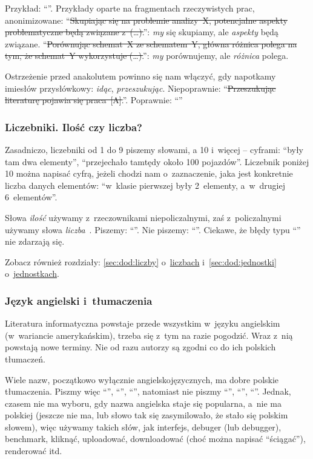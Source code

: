 Przykład: ``''. Przykłady oparte na fragmentach rzeczywistych prac, anonimizowane: ``{\color{red}\sout{Skupiając się na problemie analizy~X, potencjalne aspekty problematyczne będą związane z~(\dots).}}'': {\em my} się skupiamy, ale {\em aspekty} będą związane. ``{\color{red}\sout{Porównując schemat~X ze schematem~Y, główna różnica polega na tym, że schemat~Y wykorzystuje (\dots).}}'': {\em my} porównujemy, ale {\em różnica} polega.

Ostrzeżenie przed anakolutem powinno się nam włączyć, gdy napotkamy imiesłów przysłówkowy: {\em idąc}, {\em przeszukując}. Niepoprawnie: ``{\color{red}\sout{Przeszukując literaturę po\-ja\-wia się praca~[A].}}''. Poprawnie: ``''


\subsubsection{Liczebniki. Ilość czy liczba?}
\label{sec:dod:liczebniki}

Zasadniczo, liczebniki od 1 do 9 piszemy słowami, a 10 i~więcej -- cyframi: ``były tam dwa elementy'', ``przejechało tamtędy około 100 pojazdów''. Liczebnik poniżej 10 można napisać cyfrą, jeżeli chodzi nam o~zaznaczenie, jaka jest konkretnie liczba danych elementów: ``w~klasie pierwszej były 2~elementy, a~w~drugiej 6~elementów''.

Słowa {\em ilość} używamy z~rzeczownikami niepoliczalnymi, zaś z~policzalnymi używamy słowa {\em liczba}~. Piszemy: ``''. Nie piszemy: ``''. Ciekawe, że błędy typu ``'' nie zdarzają się.

Zobacz również rozdziały: \ref{sec:dod:liczby} o~\hyperref[sec:dod:liczby]{liczbach} i~\ref{sec:dod:jednostki} o~\hyperref[sec:dod:jednostki]{jednostkach}.


\subsubsection{Język angielski i~tłumaczenia}
\label{sec:dod:jezyk-ang}

Literatura informatyczna powstaje przede wszystkim w~języku angielskim (w~wariancie amerykańskim), trzeba się z~tym na razie pogodzić. Wraz z~nią powstają nowe terminy. Nie od razu autorzy są zgodni co do ich polskich tłumaczeń.

Wiele nazw, początkowo wyłącznie angielskojęzycznych, ma dobre polskie tłumaczenia. Piszmy więc ``'', ``'', ``'', natomiast nie piszmy ``'', ``'', ``''. Jednak, czasem nie ma wyboru, gdy nazwa angielska staje się popularna, a~nie ma polskiej (jeszcze nie ma, lub słowo tak się zasymilowało, że stało się polskim słowem), więc używamy takich słów, jak interfejs, debuger (lub debugger), benchmark, kliknąć, uploadować, downloadować (choć można napisać ``ściągać''), renderować itd.

